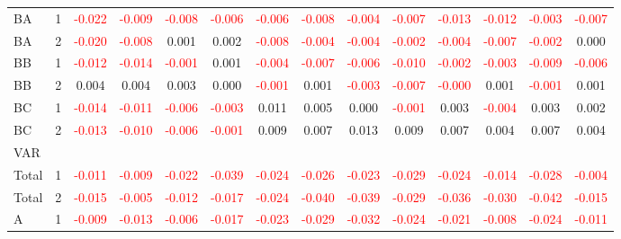 \begin{table}[!htb]
{\begin{tabular}{llcccccccccccc}
BA & 1 & \textcolor{red}{-0.022} & \textcolor{red}{-0.009} & \textcolor{red}{-0.008} & \textcolor{red}{-0.006} & \textcolor{red}{-0.006} & \textcolor{red}{-0.008} & \textcolor{red}{-0.004} & \textcolor{red}{-0.007} & \textcolor{red}{-0.013} & \textcolor{red}{-0.012} & \textcolor{red}{-0.003} & \textcolor{red}{-0.007}\\
BA & 2 & \textcolor{red}{-0.020} & \textcolor{red}{-0.008} & 0.001 & 0.002 & \textcolor{red}{-0.008} & \textcolor{red}{-0.004} & \textcolor{red}{-0.004} & \textcolor{red}{-0.002} & \textcolor{red}{-0.004} & \textcolor{red}{-0.007} & \textcolor{red}{-0.002} & 0.000\\
BB & 1 & \textcolor{red}{-0.012} & \textcolor{red}{-0.014} & \textcolor{red}{-0.001} & 0.001 & \textcolor{red}{-0.004} & \textcolor{red}{-0.007} & \textcolor{red}{-0.006} & \textcolor{red}{-0.010} & \textcolor{red}{-0.002} & \textcolor{red}{-0.003} & \textcolor{red}{-0.009} & \textcolor{red}{-0.006}\\
BB & 2 & 0.004 & 0.004 & 0.003 & 0.000 & \textcolor{red}{-0.001} & 0.001 & \textcolor{red}{-0.003} & \textcolor{red}{-0.007} & \textcolor{red}{-0.000} & 0.001 & \textcolor{red}{-0.001} & 0.001\\
BC & 1 & \textcolor{red}{-0.014} & \textcolor{red}{-0.011} & \textcolor{red}{-0.006} & \textcolor{red}{-0.003} & 0.011 & 0.005 & 0.000 & \textcolor{red}{-0.001} & 0.003 & \textcolor{red}{-0.004} & 0.003 & 0.002\\
BC & 2 & \textcolor{red}{-0.013} & \textcolor{red}{-0.010} & \textcolor{red}{-0.006} & \textcolor{red}{-0.001} & 0.009 & 0.007 & 0.013 & 0.009 & 0.007 & 0.004 & 0.007 & 0.004\\
\hline
VAR &  &  &  &  &  &  &  &  &  &  &  &  & \\
\hline
Total & 1 & \textcolor{red}{-0.011} & \textcolor{red}{-0.009} & \textcolor{red}{-0.022} & \textcolor{red}{-0.039} & \textcolor{red}{-0.024} & \textcolor{red}{-0.026} & \textcolor{red}{-0.023} & \textcolor{red}{-0.029} & \textcolor{red}{-0.024} & \textcolor{red}{-0.014} & \textcolor{red}{-0.028} & \textcolor{red}{-0.004}\\
Total & 2 & \textcolor{red}{-0.015} & \textcolor{red}{-0.005} & \textcolor{red}{-0.012} & \textcolor{red}{-0.017} & \textcolor{red}{-0.024} & \textcolor{red}{-0.040} & \textcolor{red}{-0.039} & \textcolor{red}{-0.029} & \textcolor{red}{-0.036} & \textcolor{red}{-0.030} & \textcolor{red}{-0.042} & \textcolor{red}{-0.015}\\
A & 1 & \textcolor{red}{-0.009} & \textcolor{red}{-0.013} & \textcolor{red}{-0.006} & \textcolor{red}{-0.017} & \textcolor{red}{-0.023} & \textcolor{red}{-0.029} & \textcolor{red}{-0.032} & \textcolor{red}{-0.024} & \textcolor{red}{-0.021} & \textcolor{red}{-0.008} & \textcolor{red}{-0.024} & \textcolor{red}{-0.011}\\

\end{tabular}}
\end{table}
